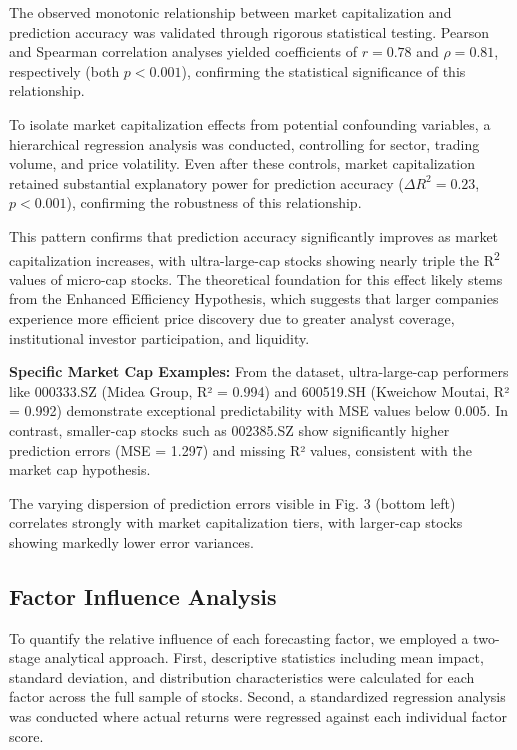 \documentclass[3p,times,procedia]{elsarticle}
\begin{document}
The observed monotonic relationship between market capitalization and prediction accuracy was validated through rigorous statistical testing. Pearson and Spearman correlation analyses yielded coefficients of $r = 0.78$ and $\rho = 0.81$, respectively (both $p < 0.001$), confirming the statistical significance of this relationship.

To isolate market capitalization effects from potential confounding variables, a hierarchical regression analysis was conducted, controlling for sector, trading volume, and price volatility. Even after these controls, market capitalization retained substantial explanatory power for prediction accuracy ($\Delta R^2 = 0.23$, $p < 0.001$), confirming the robustness of this relationship.


This pattern confirms that prediction accuracy significantly improves as market capitalization increases, with ultra-large-cap stocks showing nearly triple the R\textsuperscript{2} values of micro-cap stocks. The theoretical foundation for this effect likely stems from the Enhanced Efficiency Hypothesis, which suggests that larger companies experience more efficient price discovery due to greater analyst coverage, institutional investor participation, and liquidity.

\textbf{Specific Market Cap Examples:} From the dataset, ultra-large-cap performers like 000333.SZ (Midea Group, R² = 0.994) and 600519.SH (Kweichow Moutai, R² = 0.992) demonstrate exceptional predictability with MSE values below 0.005. In contrast, smaller-cap stocks such as 002385.SZ show significantly higher prediction errors (MSE = 1.297) and missing R² values, consistent with the market cap hypothesis.

The varying dispersion of prediction errors visible in Fig. 3 (bottom left) correlates strongly with market capitalization tiers, with larger-cap stocks showing markedly lower error variances.

\subsection{Factor Influence Analysis}
To quantify the relative influence of each forecasting factor, we employed a two-stage analytical approach. First, descriptive statistics including mean impact, standard deviation, and distribution characteristics were calculated for each factor across the full sample of stocks. Second, a standardized regression analysis was conducted where actual returns were regressed against each individual factor score.
\end{document}
